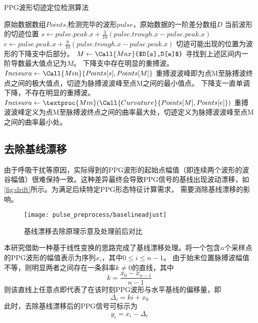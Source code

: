 \begin{breakablealgorithm}
    \caption{PPG波形切迹定位检测算法}
    \label{alg:incisuras_detect}
    \begin{algorithmic}[1] %
        \Require 原始数据数组$Points$,检测完毕的波形$pulse$，原始数据的一阶差分数组$D$
        \Ensure 当前波形的切迹位置
            \State $s \gets pulse.peak.x + \frac{3}{10}(pulse.trough.x-pulse.peak.x)$
            \State $e \gets pulse.peak.x + \frac{9}{10}(pulse.trough.x-pulse.peak.x)$
            \State \Comment 切迹可能出现的位置为波形的下降支中后部分。
            \State $M  \gets \Call{Max}{$D[s],D[e]$}$
            \State \Comment 寻找到上述区间内一阶导数最大值点记为$M$。
                \State \Comment 下降支中存在明显的重搏波。
                \State $Incisura \gets \Call{Min}{Points[s],Points[M]}$
                \State \Comment 重搏波波峰即为点M至脉搏波终点之间的极大值点，切迹为脉搏波波峰至点M之间的最小值点。
            \Else
                \State \Comment 下降支一直单调下降，不存在明显的重搏波。
                \State $Incisura \gets \textproc{Min}({\Call{Curvature}{Points[M],Points[e]}})$
                \State \Comment 重搏波波峰定义为点M至脉搏波终点之间的曲率最大处，切迹定义为脉搏波波峰至点M之间的曲率最小处。
            \EndIf
            \State {}
        \EndFunction
    \end{algorithmic}
\end{breakablealgorithm}

\subsection{去除基线漂移}
由于呼吸干扰等原因，实际得到的PPG波形的起始点幅值（即连续两个波形的波谷幅值）很难保持一致。这种差异最终会导致PPG信号的基线出现波动漂移，如\autoref{fig:drift}所示。为满足后续特定PPG形态特征计算需求，
需要消除基线漂移的影响。
\begin{figure}[htbp]
    \centering
    \texttt{[image: pulse\_preprocess/baselineadjust]}
    \caption{\label{fig:drift}基线漂移去除原理示意及处理前后对比}
\end{figure}

本研究借助一种基于线性变换的思路完成了基线漂移处理。将一个包含$n$个采样点的PPG波形的幅值表示为序列$x_i$，其中$0 \le i \le n-1$。
由于始末位置脉搏波幅值不等，则明显两者之间存在一条斜率$k \ne 0$的直线，其中
\begin{equation}
    \label{equ:linek}
    k=\frac{x_0-x_{n-1}}{n-1}
\end{equation}
则该直线上任意点即代表了在该时刻PPG波形与水平基线的偏移量，即
\begin{equation}
    \label{equ:liney}
    \Delta_i=ki+x_0
\end{equation}
此时，去除基线漂移后的PPG信号可标示为
\begin{equation}
    \label{equ:adjusta}
    y_i=x_i-\Delta_i
\end{equation}

